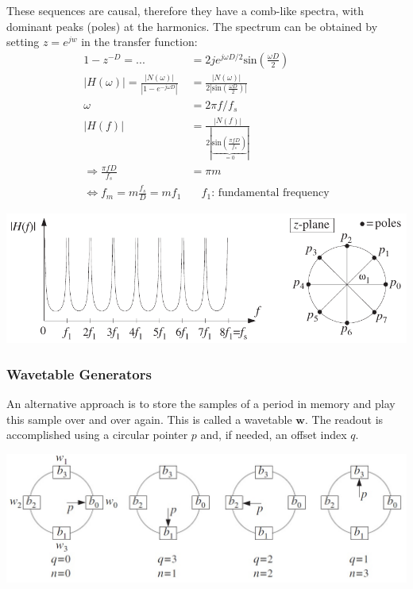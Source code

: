 These sequences are causal, therefore they have a comb-like spectra, with dominant peaks (poles) at the harmonics.
The spectrum can be obtained by setting $z=e^{jw}$ in the transfer function:
\begin{align*}
  1 - z^{-D} = ... &= 2je^{j\omega D/2}\text{sin}(\frac{\omega D}{2}) \\
  |H(\omega)| = \frac{|N(\omega)|}{|1-e^{-j\omega D}|} &= \frac{|N(\omega)|}{2|\text{sin}(\frac{\omega D}{2})|} \\
  \omega &= 2\pi f/f_s \\
  |H(f)| &= \frac{|N(f)|}{2|\underbrace{\text{sin}(\frac{\pi fD}{f_s})}_{=0}|} \\
  \Rightarrow \frac{\pi fD}{f_s} &= \pi m \\
  \Leftrightarrow f_m = m\frac{f_s}{D} = mf_1 &\quad f_1 \text{: fundamental frequency}
\end{align*}
\begin{center}
  \includegraphics[width=\linewidth]{images/SignProcApp_Spectrum.png}
\end{center}


\subsubsection{Wavetable Generators}
An alternative approach is to store the samples of a period in memory and
play this sample over and over again. This is called a wavetable $\mathbf{w}$. The readout is accomplished using a circular pointer $p$ and, if needed, an offset index $q$.

\begin{center}
	\includegraphics[width=\linewidth]{images/SignProcApp_Wavetable.jpg}
\end{center}


